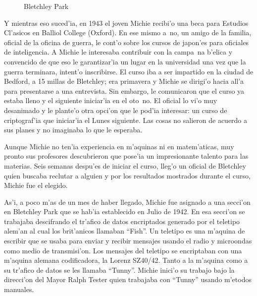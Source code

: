 \documentclass[11pt]{article}
\begin{document}
\begin{figure}[h]

\centering
{}
\caption[Bletchley Park]{Bletchley Park} 
\label{fig:bp}

\end{figure}

\medskip


Y mientras eso suced'ia, en 1943 el joven Michie recibi'o una beca para Estudios Cl'asicos en Balliol College (Oxford). En ese mismo a~no, un amigo de la familia, oficial de la oficina de guerra, le cont'o sobre los cursos de japon'es para oficiales de inteligencia. A Michie le interesaba contribuir con la campa~na b'elica y convencido de que eso le garantizar'ia un lugar en la universidad una vez que la guerra terminara, intent'o inscribirse. El curso iba a ser impartido en la ciudad de Bedford, a 15 millas de Bletchley; era primavera y Michie se dirigi'o hacia all'a para presentarse a una entrevista. Sin embargo, le comunicaron que el curso ya estaba lleno y el siguiente iniciar'ia en el oto~no. El oficial lo vi'o muy desanimado y le plante'o otra opci'on que le pod'ia interesar: un curso de criptograf'ia que iniciar'ia el Lunes siguiente. Las cosas no salieron de acuerdo a sus planes y no imaginaba lo que le esperaba.

Aunque Michie no ten'ia experiencia en m'aquinas ni en matem'aticas, muy pronto sus profesores descubrieron que pose'ia un impresionante talento para las materias. Seis semanas despu'es de iniciar el curso, lleg'o un oficial de Bletchley quien buscaba reclutar a alguien y por los resultados mostrados durante el curso, Michie fue el elegido.

As'i, a poco m'as de un mes de haber llegado, Michie fue asignado a una secci'on en Bletchley Park que se hab'ia establecido en Julio de 1942. En esa secci'on se trabajaba descifrando el tr'afico de datos encriptados generado por el teletipo alem'an al cual los brit'anicos llamaban ``Fish''. Un teletipo es una m'aquina de escribir que se usaba para enviar y recibir mensajes usando el radio y microondas como medio de transmisi'on. Los mensajes del teletipo se encriptaban con una m'aquina alemana codificadora, la Lorenz SZ40/42. Tanto a la m'aquina como a su tr'afico de datos se les llamaba ``Tunny''. Michie inici'o su trabajo bajo la direcci'on del Mayor Ralph Tester quien trabajaba con ``Tunny'' usando m'etodos manuales. 
\end{document}
